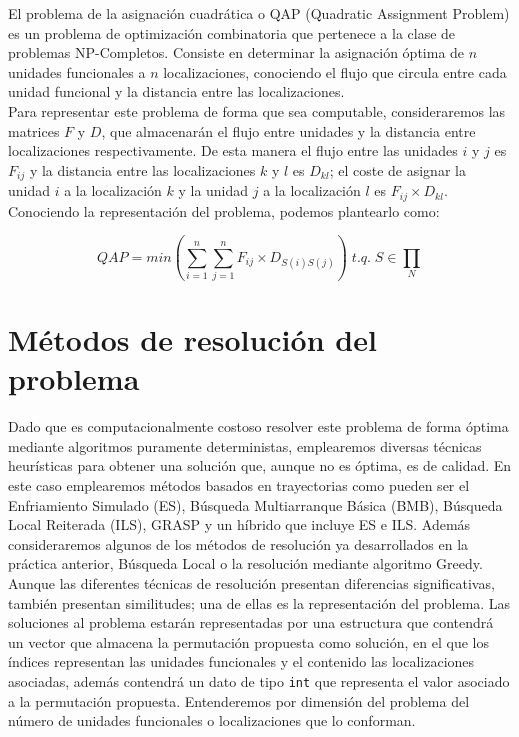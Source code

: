 \documentclass[11pt,a4paper]{article}
\begin{document}
	\noindent El problema de la asignación cuadrática o QAP (Quadratic Assignment Problem) es un problema de optimización combinatoria que pertenece a la clase de problemas NP-Completos. Consiste en determinar la asignación óptima de $n$ unidades funcionales a $n$ localizaciones, conociendo el flujo que circula entre cada unidad funcional y la distancia entre las localizaciones.\\
	
	\noindent Para representar este problema de forma que sea computable, consideraremos las matrices $F$ y $D$, que almacenarán el flujo entre unidades y la distancia entre localizaciones respectivamente. De esta manera el flujo entre las unidades $i$ y $j$ es $F_{ij}$ y la distancia entre las localizaciones $k$ y $l$ es $D_{kl}$; el coste de asignar la unidad $i$ a la localización $k$ y la unidad $j$ a la localización $l$ es $F_{ij} \times D_{kl}$.\\
	
	\noindent Conociendo la representación del problema, podemos plantearlo como:
	
	$$ QAP = min \left( \sum_{i=1}^{n}\sum_{j=1}^{n}F_{ij} \times D_{S(i)S(j)} \right)\; t.q.\; S \in \prod_{N} $$
	
\section{Métodos de resolución del problema}
	
	\noindent Dado que es computacionalmente costoso resolver este problema de forma óptima mediante algoritmos puramente deterministas, emplearemos diversas técnicas heurísticas para obtener una solución que, aunque no es óptima, es de calidad. En este caso emplearemos métodos basados en trayectorias como pueden ser el Enfriamiento Simulado (ES), Búsqueda Multiarranque Básica (BMB), Búsqueda Local Reiterada (ILS), GRASP y un híbrido que incluye ES e ILS. Además consideraremos algunos de los métodos de resolución ya desarrollados en la práctica anterior, Búsqueda Local o la resolución mediante algoritmo Greedy.\\
	
	\noindent Aunque las diferentes técnicas de resolución presentan diferencias significativas, también presentan similitudes; una de ellas es la representación del problema. Las soluciones al problema estarán representadas por una estructura que contendrá un vector que almacena la permutación propuesta como solución, en el que los índices representan las unidades funcionales y el contenido las localizaciones asociadas, además contendrá un dato de tipo \texttt{int} que representa el valor asociado a la permutación propuesta. Entenderemos por dimensión del problema del número de unidades funcionales o localizaciones que lo conforman.
	
\end{document}
